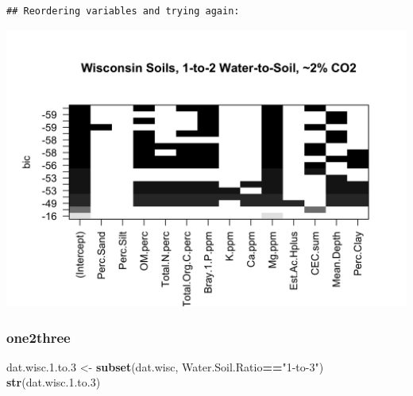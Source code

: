\documentclass[]{article}
\newenvironment{Shaded}{\begin{snugshade}}{\end{snugshade}}
\newcommand{\DataTypeTok}[1]{\textcolor[rgb]{0.13,0.29,0.53}{#1}}
\newcommand{\FloatTok}[1]{\textcolor[rgb]{0.00,0.00,0.81}{#1}}
\newcommand{\KeywordTok}[1]{\textcolor[rgb]{0.13,0.29,0.53}{\textbf{#1}}}
\newcommand{\NormalTok}[1]{#1}
\newcommand{\OperatorTok}[1]{\textcolor[rgb]{0.81,0.36,0.00}{\textbf{#1}}}
\newcommand{\StringTok}[1]{\textcolor[rgb]{0.31,0.60,0.02}{#1}}
\begin{document}
\begin{verbatim}
## Reordering variables and trying again:
\end{verbatim}

\begin{Shaded}
\end{Shaded}

\includegraphics{output-rmd/bic.wisc.one2two.highco2-1.png}

\hypertarget{one2three}{%
\subsubsection{one2three}\label{one2three}}

\begin{Shaded}
\begin{Highlighting}[]
\NormalTok{dat.wisc.}\FloatTok{1.}\NormalTok{to}\FloatTok{.3}\NormalTok{ <-}\StringTok{ }\KeywordTok{subset}\NormalTok{(dat.wisc, Water.Soil.Ratio}\OperatorTok{==}\StringTok{"1-to-3"}\NormalTok{)}
\KeywordTok{str}\NormalTok{(dat.wisc.}\FloatTok{1.}\NormalTok{to}\FloatTok{.3}\NormalTok{)}
\end{Highlighting}
\end{Shaded}
\end{document}
